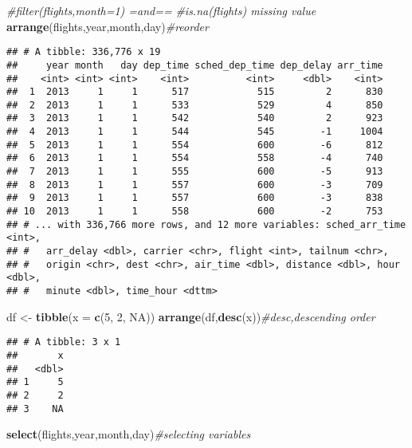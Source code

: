 \documentclass[]{article}
\newenvironment{Shaded}{\begin{snugshade}}{\end{snugshade}}
\newcommand{\CommentTok}[1]{\textcolor[rgb]{0.56,0.35,0.01}{\textit{#1}}}
\newcommand{\DataTypeTok}[1]{\textcolor[rgb]{0.13,0.29,0.53}{#1}}
\newcommand{\DecValTok}[1]{\textcolor[rgb]{0.00,0.00,0.81}{#1}}
\newcommand{\KeywordTok}[1]{\textcolor[rgb]{0.13,0.29,0.53}{\textbf{#1}}}
\newcommand{\NormalTok}[1]{#1}
\newcommand{\OtherTok}[1]{\textcolor[rgb]{0.56,0.35,0.01}{#1}}
\newcommand{\StringTok}[1]{\textcolor[rgb]{0.31,0.60,0.02}{#1}}
\begin{document}
\begin{Shaded}
\begin{Highlighting}[]
\CommentTok{#filter(flights,month=1) =and==}
\CommentTok{#is.na(flights) missing value}
\KeywordTok{arrange}\NormalTok{(flights,year,month,day)}\CommentTok{#reorder}
\end{Highlighting}
\end{Shaded}

\begin{verbatim}
## # A tibble: 336,776 x 19
##     year month   day dep_time sched_dep_time dep_delay arr_time
##    <int> <int> <int>    <int>          <int>     <dbl>    <int>
##  1  2013     1     1      517            515         2      830
##  2  2013     1     1      533            529         4      850
##  3  2013     1     1      542            540         2      923
##  4  2013     1     1      544            545        -1     1004
##  5  2013     1     1      554            600        -6      812
##  6  2013     1     1      554            558        -4      740
##  7  2013     1     1      555            600        -5      913
##  8  2013     1     1      557            600        -3      709
##  9  2013     1     1      557            600        -3      838
## 10  2013     1     1      558            600        -2      753
## # ... with 336,766 more rows, and 12 more variables: sched_arr_time <int>,
## #   arr_delay <dbl>, carrier <chr>, flight <int>, tailnum <chr>,
## #   origin <chr>, dest <chr>, air_time <dbl>, distance <dbl>, hour <dbl>,
## #   minute <dbl>, time_hour <dttm>
\end{verbatim}

\begin{Shaded}
\begin{Highlighting}[]
\NormalTok{df <-}\StringTok{ }\KeywordTok{tibble}\NormalTok{(}\DataTypeTok{x =} \KeywordTok{c}\NormalTok{(}\DecValTok{5}\NormalTok{, }\DecValTok{2}\NormalTok{, }\OtherTok{NA}\NormalTok{))}
\KeywordTok{arrange}\NormalTok{(df,}\KeywordTok{desc}\NormalTok{(x))}\CommentTok{#desc,descending order}
\end{Highlighting}
\end{Shaded}

\begin{verbatim}
## # A tibble: 3 x 1
##       x
##   <dbl>
## 1     5
## 2     2
## 3    NA
\end{verbatim}

\begin{Shaded}
\begin{Highlighting}[]
\KeywordTok{select}\NormalTok{(flights,year,month,day)}\CommentTok{#selecting variables}
\end{Highlighting}
\end{Shaded}
\end{document}
